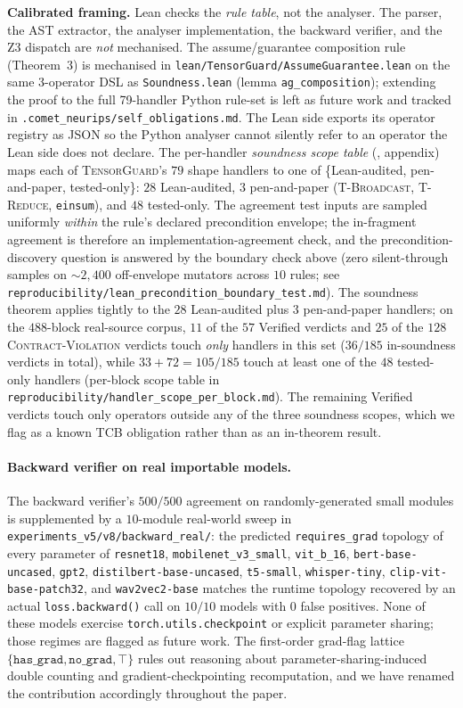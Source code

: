 \textbf{Calibrated framing.} Lean checks the \emph{rule table},
not the analyser. The parser, the AST extractor, the analyser
implementation, the backward verifier, and the Z3 dispatch are
\emph{not} mechanised. The assume/guarantee composition rule
(Theorem~3) is mechanised in
\texttt{lean/TensorGuard/AssumeGuarantee.lean} on the same
3-operator DSL as \texttt{Soundness.lean} (lemma
\texttt{ag\_composition}); extending the proof to the full
79-handler Python rule-set is left as future work and tracked in
\texttt{.comet\_neurips/self\_obligations.md}. The Lean side
exports its operator registry as JSON so the Python analyser
cannot silently refer to an operator the Lean side does not
declare. The per-handler \emph{soundness scope table}
(, appendix) maps each of
\textsc{TensorGuard}'s $79$ shape handlers to one of
\{Lean-audited, pen-and-paper, tested-only\}: $28$ Lean-audited,
$3$ pen-and-paper (\textsc{T-Broadcast}, \textsc{T-Reduce},
\texttt{einsum}), and $48$ tested-only.
The agreement test inputs are sampled uniformly \emph{within}
the rule's declared precondition envelope; the in-fragment
agreement is therefore an implementation-agreement check, and
the precondition-discovery question is answered by the
boundary check above (zero silent-through samples on $\sim$$2{,}400$
off-envelope mutators across $10$ rules; see
\texttt{reproducibility/lean\_precondition\_boundary\_test.md}).
The soundness theorem applies tightly to the $28$ Lean-audited
plus $3$ pen-and-paper handlers; on the $488$-block real-source
corpus, $11$ of the $57$ Verified verdicts and $25$ of the $128$
\textsc{Contract-Violation} verdicts touch \emph{only} handlers
in this set ($36/185$ in-soundness verdicts in total), while
$33+72{=}105/185$ touch at least one of the $48$ tested-only
handlers (per-block scope table in
\texttt{reproducibility/handler\_scope\_per\_block.md}).  The
remaining Verified verdicts touch only operators outside any of
the three soundness scopes, which we flag as a known
TCB obligation rather than as an in-theorem result.

\paragraph{Backward verifier on real importable models.}
The backward verifier's $500/500$ agreement on randomly-generated
small modules is supplemented by a $10$-module real-world sweep
in \texttt{experiments\_v5/v8/backward\_real/}: the predicted
\texttt{requires\_grad} topology of every parameter of
\texttt{resnet18}, \texttt{mobilenet\_v3\_small},
\texttt{vit\_b\_16}, \texttt{bert-base-uncased}, \texttt{gpt2},
\texttt{distilbert-base-uncased}, \texttt{t5-small},
\texttt{whisper-tiny}, \texttt{clip-vit-base-patch32}, and
\texttt{wav2vec2-base} matches the runtime topology recovered by
an actual \texttt{loss.backward()} call on $10/10$ models with
$0$ false positives. None of these models exercise
\texttt{torch.utils.checkpoint} or explicit parameter sharing;
those regimes are flagged as future work. The first-order
grad-flag lattice $\{\texttt{has\_grad}, \texttt{no\_grad},
\top\}$ rules out reasoning about parameter-sharing-induced
double counting and gradient-checkpointing recomputation, and
we have renamed the contribution accordingly throughout the
paper.
